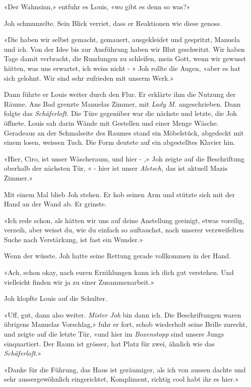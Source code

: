«Der Wahnsinn,» entfuhr es Louis, «wo gibt es denn
so was?»

Joh schmunzelte. Sein Blick verriet, dass er Reaktionen wie diese genoss.

«Die haben wir selbst gemacht, gemauert, ausgekleidet und gespritzt,
Manuela und ich. Von der Idee bis zur Ausführung haben wir Blut
geschwitzt. Wir haben Tage damit verbracht, die Rundungen zu schleifen,
mein Gott, wenn wir gewusst hätten, was uns erwartet, ich weiss nicht - »
Joh rollte die Augen, «aber es hat sich gelohnt. Wir sind sehr zufrieden
mit unserm Werk.»

Dann führte er Louis weiter durch den Flur. Er erklärte ihm die Nutzung
der Räume. Ans Bad grenzte Manuelas Zimmer, mit \emph{Lady M.}
angeschrieben. Dann folgte das \emph{Schäferloft.} Die Türe gegenüber
war die nächste und letzte, die Joh öffnete. Louis sah darin Wände mit
Gestellen und einer Menge Wäsche. Geradeaus an der Schmalseite des
Raumes stand ein Möbelstück, abgedeckt mit einem losen, weissen Tuch.
Die Form deutete auf ein abgestelltes Klavier hin.

«Hier, Ciro, ist unser Wäscheraum, und hier - ,» Joh zeigte auf die
Beschriftung oberhalb der nächsten Tür, « - hier ist unser \emph{Aletsch,} das
ist aktuell Mazis Zimmer.»

Mit einem Mal blieb Joh stehen. Er hob seinen Arm und stützte sich mit der Hand an der Wand ab. Er grinste.

«Ich rede schon, als hätten wir uns auf deine Anstellung geeinigt, etwas
voreilig, verzeih, aber weisst du, wie du einfach so auftauchst, nach
unserer verzweifelten Suche nach Verstärkung, ist fast ein Wunder.»

Wenn der wüsste. Joh hatte seine Rettung gerade vollkommen in der Hand.

«Ach, schon okay, nach euren Erzählungen kann ich dich gut verstehen.
Und vielleicht finden wir ja zu einer Zusammenarbeit.»

Joh klopfte Louis auf die Schulter.

«Uff, gut, dann also weiter. \emph{Mister Joh} bin dann ich. Die
Beschriftungen waren übrigens Manuelas Vorschlag,» fuhr er fort, schob
wiederholt seine Brille zurecht, und zeigte auf die letzte Tür, «und
hier im \emph{Boxenstopp} sind unsere Jungs einquartiert. Der Raum ist
grösser, hat Platz für zwei, ähnlich wie das \emph{Schäferloft}.»

«Danke für die Führung, das Haus ist geräumiger, als ich von aussen
dachte und sehr aussergewöhnlich eingerichtet, Kompliment, richtig cool
habt ihr es hier.»

